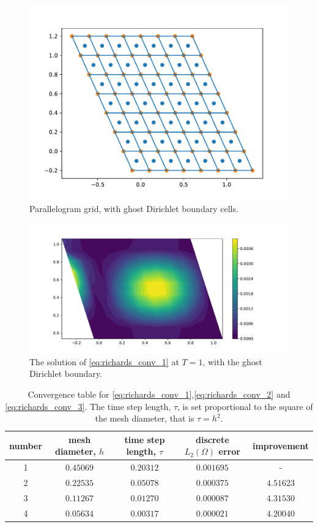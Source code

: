 \documentclass[../Main/main.tex]{subfiles}
\begin{document}
	\begin{figure}
	\centering
	\includegraphics[width=0.8\linewidth]{MeshRichards1.pdf}
	\caption{Parallelogram grid, with ghost Dirichlet boundary cells.}
	\label{fig:MeshRichards1}
	\end{figure}
	\begin{figure}[H]
		\centering
		\includegraphics[width=1\linewidth]{PressureRichards11.pdf}
		\caption{The solution of \eqref{eq:richards_conv_1} at $T=1$, with the ghost Dirichlet boundary.}
		\label{fig:PressureRichards1}
	\end{figure}
	\begin{table}[H]
	\centering
	\begin{tabular}{|c c c c c|}
		\hline
			number & mesh diameter, $h$ & time step length, $\tau$ & discrete $L_2(\Omega)$ error & improvement \\
		\hline
1&$0.45069$&$0.20312$&$0.001695$&-\\ 
2&$0.22535$&$0.05078$&$0.000375$&$4.51623$\\
3&$0.11267$&$0.01270$&$0.000087$&$4.31530$\\
4&$0.05634$&$0.00317$&$0.000021$&$4.20040$\\
		\hline
	\end{tabular}
	\caption{Convergence table for \eqref{eq:richards_conv_1},\eqref{eq:richards_conv_2} and \eqref{eq:richards_conv_3}. The time step length, $\tau$, is set proportional to the square of the mesh diameter, that is $\tau=h^2$.}
	\label{tab:rihcards1}
\end{table}
\end{document}
